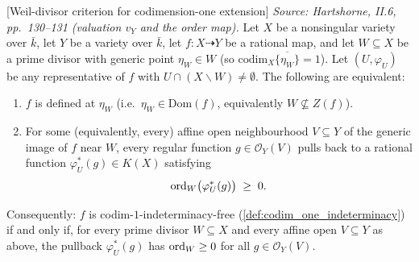 \begin{theorem}

  [Weil-divisor criterion for codimension-one extension]
  \label{thm:weil_divisor_obstruction}
  \textit{Source: Hartshorne, II.6, pp.~130--131 (valuation \(v_Y\) and the order map).}
  Let \(X\) be a nonsingular variety over \(\bar k\), let \(Y\) be a variety over \(\bar k\),
  let \(f \colon X \dashrightarrow Y\) be a rational map, and let \(W \subseteq X\) be a
  prime divisor with generic point \(\eta_W \in W\) (so
  \(\mathrm{codim}_X \overline{\{\eta_W\}} = 1\)). Let \((U, \varphi_U)\) be any representative of
  \(f\) with \(U \cap (X \smallsetminus W) \neq \emptyset\). The following are equivalent:
  \begin{enumerate}
    \item \(f\) is defined at \(\eta_W\) (i.e.\ \(\eta_W \in \mathrm{Dom}(f)\), equivalently
      \(W \not\subseteq Z(f)\)).
    \item For some (equivalently, every) affine open neighbourhood \(V \subseteq Y\) of
      the generic image of \(f\) near \(W\), every regular function \(g \in
      \mathcal O_Y(V)\) pulls back to a rational function \(\varphi_U^\ast(g) \in K(X)\)
      satisfying
      \[
        \operatorname{ord}_W\bigl(\varphi_U^\ast(g)\bigr) \;\geq\; 0.
      \]
  \end{enumerate}

  Consequently: \(f\) is codim-\(1\)-indeterminacy-free
  (\cref{def:codim_one_indeterminacy}) if and only if, for every prime divisor
  \(W \subseteq X\) and every affine open \(V \subseteq Y\) as above, the pullback
  \(\varphi_U^\ast(g)\) has \(\operatorname{ord}_W \geq 0\) for all \(g \in \mathcal O_Y(V)\).
\end{theorem}

